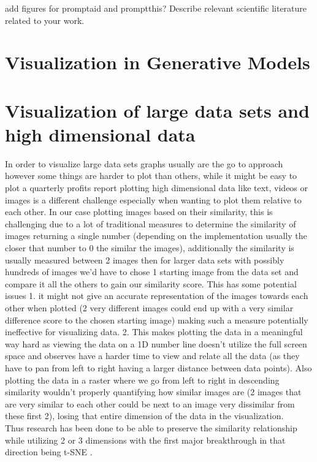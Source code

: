 \documentclass[
  a4paper,  %
  twoside,  %
  bibliography=totoc,
  headsepline,
  cleardoublepage=empty,
  parskip=half,
  draft=false
]{scrbook}
\begin{document}
add figures for promptaid and promptthis?
Describe relevant scientific literature related to your work.
\section{Visualization in Generative Models}
\section{Visualization of large data sets and high dimensional data}
In order to visualize large data sets graphs usually are the go to approach however some things are harder to plot than others, while it might be easy to plot a quarterly profits report plotting high dimensional data like text, videos or images is a different challenge especially when wanting to plot them relative to each other. In our case plotting images based on their similarity, this is challenging due to a lot of traditional measures to determine the similarity of images returning a single number (depending on the implementation usually the closer that number to 0 the similar the images), additionally the similarity is usually measured between 2 images then for larger data sets with possibly hundreds of images we'd have to chose 1 starting image from the data set and compare it all the others to gain our similarity score. This has some potential issues 1. it might not give an accurate representation of the images towards each other when plotted (2 very different images could end up with a very similar difference score to the chosen starting image) making such a measure potentially ineffective for visualizing data. 2. This makes plotting the data in a meaningful way hard as viewing the data on a 1D number line doesn't utilize the full screen space and observes have a harder time to view and relate all the data (as they have to pan from left to right having a larger distance between data points). Also plotting the data in a raster where we go from left to right in descending similarity wouldn't properly quantifying how similar images are  (2 images that are very similar to each other could be next to an image very dissimilar from these first 2), losing that entire dimension of the data in the visualization. \\
Thus research has been done to be able to preserve the similarity relationship while utilizing 2 or 3 dimensions with the first major breakthrough in that direction being t-SNE \cite{van2008visualizing}.
\end{document}

